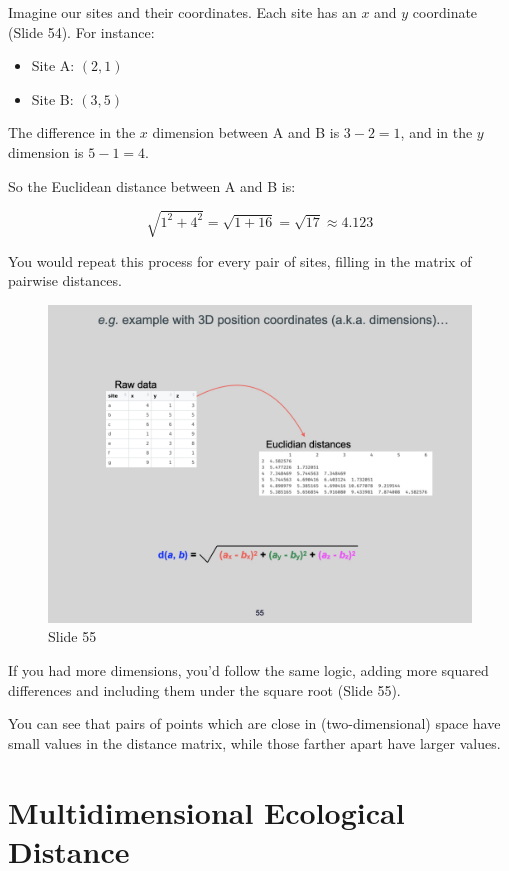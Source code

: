 \documentclass[
  10pt,
]{book}
\providecommand{\tightlist}{%
  \setlength{\itemsep}{0pt}\setlength{\parskip}{0pt}}
\begin{document}
Imagine our sites and their coordinates. Each site has an \(x\) and
\(y\) coordinate (Slide 54). For instance:

\begin{itemize}
\tightlist
\item
  Site A: \((2, 1)\)
\item
  Site B: \((3, 5)\)
\end{itemize}

The difference in the \(x\) dimension between A and B is \(3 - 2 = 1\),
and in the \(y\) dimension is \(5 - 1 = 4\).

So the Euclidean distance between A and B is:

\[
\sqrt{1^2 + 4^2} = \sqrt{1 + 16} = \sqrt{17} \approx 4.123
\]

You would repeat this process for every pair of sites, filling in the
matrix of pairwise distances.

\begin{figure}[ht]
\centering
\includegraphics[width=0.8\linewidth]{../images/BDC334/BDC334-055.jpeg}
\caption*{Slide 55}
\end{figure}

If you had more dimensions, you'd follow the same logic, adding more
squared differences and including them under the square root (Slide 55).

You can see that pairs of points which are close in (two-dimensional)
space have small values in the distance matrix, while those farther
apart have larger values.

\section{Multidimensional Ecological
Distance}\label{multidimensional-ecological-distance}
\end{document}
